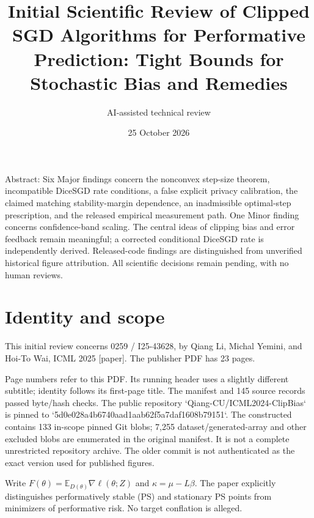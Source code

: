 \documentclass[10pt]{article}
\title{Initial Scientific Review of
Clipped SGD Algorithms for Performative Prediction: Tight Bounds for Stochastic Bias and Remedies}
\author{AI-assisted technical review}
\date{25 October 2026}
\begin{document}
\maketitle
Abstract: Six Major findings concern the nonconvex step-size theorem, incompatible DiceSGD rate conditions, a false explicit privacy calibration, the claimed matching stability-margin dependence, an inadmissible optimal-step prescription, and the released empirical measurement path. One Minor finding concerns confidence-band scaling. The central ideas of clipping bias and error feedback remain meaningful; a corrected conditional DiceSGD rate is independently derived. Released-code findings are distinguished from unverified historical figure attribution. All scientific decisions remain pending, with no human reviews.\par
\section*{Identity and scope}
This initial review concerns 0259 / I25-43628, by Qiang Li, Michal Yemini, and Hoi-To Wai, ICML 2025 [paper]. The publisher PDF has 23 pages.\par
Page numbers refer to this PDF. Its running header uses a slightly different subtitle; identity follows its first-page title. The manifest and 145 source records passed byte/hash checks. The public repository `Qiang-CU/ICML2024-ClipBias` is pinned to `5d0e028a4b6740aad1aab62f5a7daf1608b79151`. The constructed contains 133 in-scope pinned Git blobs; 7,255 dataset/generated-array and other excluded blobs are enumerated in the original manifest. It is not a complete unrestricted repository archive. The older commit is not authenticated as the exact version used for published figures.\par
Write \(F(\theta)=\mathbb E_{D(\theta)}\nabla\ell(\theta;Z)\) and \(\kappa=\mu-L\beta\). The paper explicitly distinguishes performatively stable (PS) and stationary PS points from minimizers of performative risk. No target conflation is alleged.\par
\end{document}
